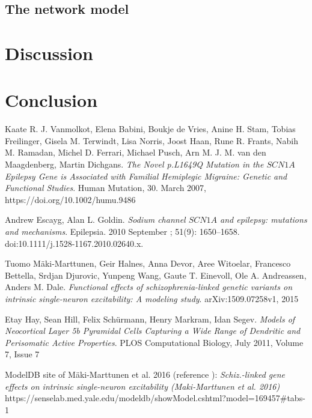 \documentclass[twocolumn, a4paper,10pt, norsk]{scrartcl}
\begin{document}
\subsection*{The network model}

\section*{Discussion}

\section*{Conclusion}


\begin{thebibliography}{9}
Kaate R. J. Vanmolkot, Elena Babini, Boukje de Vries, Anine H. Stam, Tobias Freilinger, Gisela M. Terwindt, Lisa Norris, Joost Haan, Rune R. Frants, Nabih M. Ramadan, Michel D. Ferrari, Michael Pusch, Arn M. J. M. van den Maagdenberg, Martin Dichgans.
\textit{The Novel p.L1649Q Mutation in the $SCN1A$ Epilepsy Gene is Associated with Familial Hemiplegic Migraine: Genetic and Functional Studies}. 
Human Mutation, 30. March 2007,
https://doi.org/10.1002/humu.9486

Andrew Escayg, Alan L. Goldin.
\textit{Sodium channel $SCN1A$ and epilepsy: mutations and mechanisms}. 
Epilepsia. 2010 September ; 51(9): 1650–1658. doi:10.1111/j.1528-1167.2010.02640.x.

Tuomo M\"aki-Marttunen, Geir Halnes, Anna Devor, Aree Witoelar, Francesco Bettella, Srdjan Djurovic, Yunpeng Wang, Gaute T. Einevoll, Ole A. Andreassen, Anders M. Dale.
\textit{Functional effects of schizophrenia-linked genetic variants on intrinsic single-neuron excitability: A modeling study}. 
arXiv:1509.07258v1, 2015

Etay Hay, Sean Hill, Felix Sch\"urmann, Henry Markram, Idan Segev.
\textit{Models of Neocortical Layer 5b Pyramidal Cells Capturing a Wide Range of Dendritic and Perisomatic Active Properties}. 
PLOS Computational Biology, July 2011, Volume 7, Issue 7


ModelDB site of M\"aki-Marttunen et al. 2016 (reference \cite{gautes}):
\textit{Schiz.-linked gene effects on intrinsic single-neuron excitability (Maki-Marttunen et al. 2016)}
https://senselab.med.yale.edu/modeldb/showModel.cshtml?model=169457\#tabs-1



\end{thebibliography}
\end{document}
